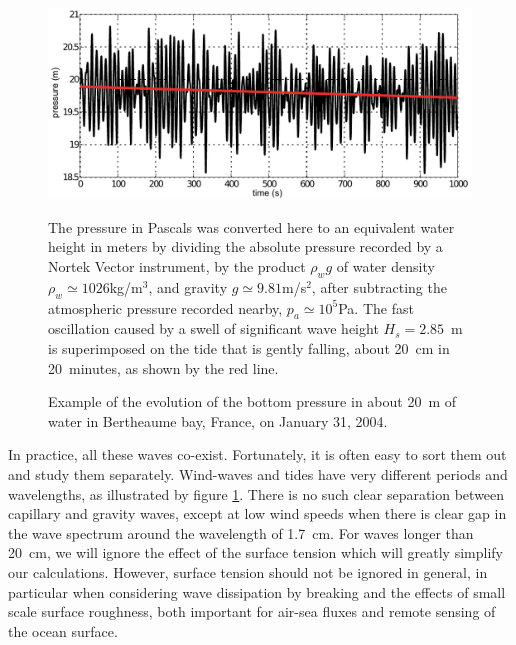 \begin{figure}
\centerline{\includegraphics[width=\textwidth]{FIGS_CH_INTRO/p_at_berth1_en.pdf}}
  \caption{Example of the evolution of the bottom pressure in about 20~m of water 
 in Bertheaume bay, France, on January 31, 2004.}{The pressure in Pascals was converted here to an equivalent water height in meters
by dividing the absolute pressure 
recorded by a Nortek Vector %
instrument, by the product $\rho_w g$ of water density $\rho_w \simeq 1026$kg/m$^3$, 
and gravity $g\simeq 9.81$m/s$^2$, after subtracting the atmospheric pressure recorded nearby, $p_a \simeq 10^5$Pa.  The 
fast oscillation caused by a swell of significant wave height $H_s=2.85$~m is superimposed on the tide 
that is gently falling, about 20~cm in 20~minutes, as shown by the red line.}
\label{pexemple}
\end{figure}

In practice, all these waves co-exist. Fortunately, it is often easy to sort them out and study them separately. 
Wind-waves and tides have very different periods and wavelengths, as illustrated by figure 
\ref{pexemple}. There is no such clear separation between capillary and gravity waves, except at low wind speeds 
when there is clear gap in the wave spectrum around the wavelength of 1.7~cm. For waves longer than 20~cm, 
we will ignore the effect of the surface tension which will greatly simplify our calculations. 
However, surface tension should not be ignored in general, in particular when considering 
wave dissipation by breaking and the effects of small scale surface roughness, both important for air-sea fluxes and remote sensing 
of the ocean surface.


